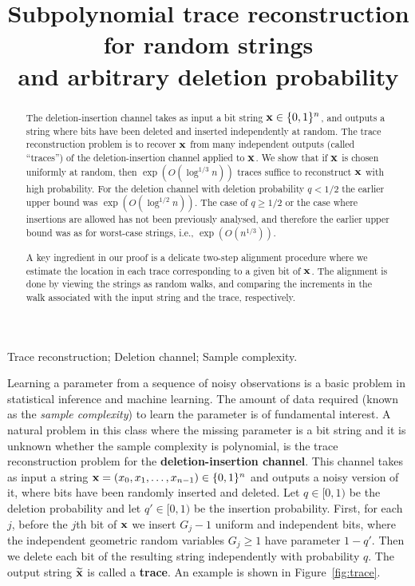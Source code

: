 \documentclass[final,12pt]{colt2018} %
\title[Subpolynomial trace reconstruction]{Subpolynomial trace reconstruction for random strings \\ and arbitrary deletion probability}
\newcommand{\1}{\mathbf{1}}
\newcommand{\wt}{\widetilde}
\def\xt{{\wt {\bf x}}}
\def\x{{\bf x}}
\begin{document}
\maketitle

\begin{abstract}
The deletion-insertion channel takes as input a bit string $\x\in
\{0,1\}^{n}$, and outputs a string where bits have been deleted and inserted independently at random. The trace reconstruction problem is to recover $\x$ from many independent outputs (called ``traces'') of the deletion-insertion channel applied to $\x$. We show that if $\x$ is chosen uniformly at random, then $\exp(O(\log^{1/3} n))$ traces suffice to reconstruct $\x$ with high probability. For the deletion channel with deletion probability $q<1/2$ the earlier upper bound was $\exp(O(\log^{1/2} n))$. The case of $q\geq 1/2$ or the case where insertions are allowed has not been previously analysed, and therefore the earlier upper bound was as for worst-case strings, i.e., $\exp(O( n^{1/3}))$.
 
A key ingredient in our proof is a delicate two-step alignment procedure where we estimate the location in each trace corresponding to a given bit of $\x$. The alignment is done by viewing the strings as random walks, and comparing the increments in the walk associated with the input string and the trace, respectively.
\end{abstract}

\begin{keywords}
	Trace reconstruction;  Deletion channel; Sample complexity.  
\end{keywords}

\vspace{\baselineskip}

Learning a parameter from a sequence of noisy observations is a basic problem in statistical inference and machine learning. The amount of data  required (known as the {\em sample complexity}) to learn the parameter is of fundamental interest.  A natural problem in this class where the missing parameter is a bit string and it is unknown whether the sample complexity is polynomial, is the trace reconstruction problem for   the {\bf deletion-insertion channel}. This channel takes as input a string
$\x=(x_0,x_1,\dots,x_{n-1}) \in \{0,1\}^{n}$ and outputs a noisy
version of it, where bits have been randomly inserted and deleted. Let $q\in[0,1)$ be the deletion probability and let $q'\in[0,1)$ be the insertion probability. First, for each $j$, before the $j$th bit of $\x$ we insert $G_j-1$ uniform and
independent bits, where the independent geometric random variables $G_j \ge 1 $ have parameter
$1-q'$. Then we delete each bit of the resulting string independently with probability $q$.
The output string $\xt$ is called a {\bf trace}.  An example is shown in Figure~\ref{fig:trace}.
\end{document}
